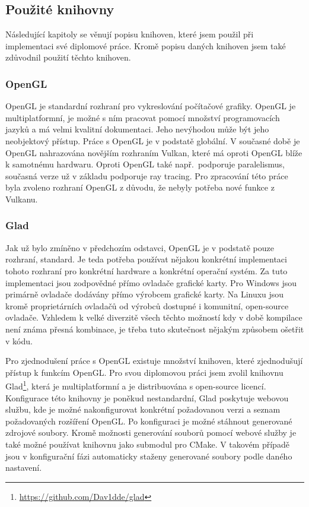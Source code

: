 \documentclass[czech,master]{diploma}
\begin{document}
\subsection{Použité knihovny}
Následující kapitoly se věnují popisu knihoven, které jsem použil při implementaci své diplomové práce. Kromě popisu daných knihoven jsem také zdůvodnil použití těchto knihoven.
\subsubsection{OpenGL}
OpenGL je standardní rozhraní pro vykreslování počítačové grafiky. OpenGL je multiplatformní, je možné s ním pracovat pomocí množství programovacích jazyků a má velmi kvalitní dokumentaci. Jeho nevýhodou může být jeho neobjektový přístup. Práce s OpenGL je v podstatě globální. V současné době je OpenGL nahrazována novějším rozhraním Vulkan, které má oproti OpenGL blíže k samotnému hardwaru. Oproti OpenGL také např.\ podporuje paralelismus, současná verze už v základu podporuje ray tracing. Pro zpracování této práce byla zvoleno rozhraní OpenGL z důvodu, že nebyly potřeba nové funkce z Vulkanu.
\subsubsection{Glad}
Jak už bylo zmíněno v předchozím odstavci, OpenGL je v podstatě pouze rozhraní, standard. Je teda potřeba používat nějakou konkrétní implementaci tohoto rozhraní pro konkrétní hardware a konkrétní operační systém. Za tuto implementaci jsou zodpovědné přímo ovladače grafické karty. Pro Windows jsou primárně ovladače dodávány přímo výrobcem grafické karty. Na Linuxu jsou kromě proprietárních ovladačů od výrobců dostupné i komunitní, open-source ovladače. Vzhledem k velké diverzitě všech těchto možností kdy v době kompilace není známa přesná kombinace, je třeba tuto skutečnost nějakým způsobem ošetřit v kódu. \par
Pro zjednodušení práce s OpenGL existuje množství knihoven, které zjednodušují přístup k funkcím OpenGL\@. Pro svou diplomovou práci jsem zvolil knihovnu Glad\footnote{\url{https://github.com/Dav1dde/glad}}, která je multiplatformní a je distribuována s open-source licencí. Konfigurace této knihovny je poněkud nestandardní, Glad poskytuje webovou službu, kde je možné nakonfigurovat konkrétní požadovanou verzi a seznam požadovaných rozšíření OpenGL\@. Po konfiguraci je možné stáhnout generované zdrojové soubory. Kromě možnosti generování souborů pomocí webové služby je také možné používat knihovnu jako submodul pro CMake. V takovém případě jsou v konfigurační fázi automaticky staženy generované soubory podle daného nastavení.
\end{document}
